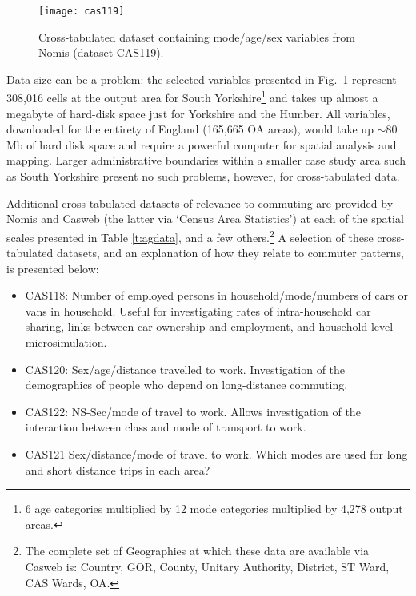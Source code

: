 \begin{figure}
\texttt{[image: cas119]}
\caption[Cross-tabulated dataset containing mode/age/sex
variables]{Cross-tabulated dataset containing mode/age/sex variables from Nomis
(dataset CAS119).}
\label{fig:cas119}
\end{figure}
Data size can be a problem: the selected variables presented in
Fig.~\ref{fig:cas119} represent 308,016 cells at the output area for
South Yorkshire\footnote{6 age categories multiplied by 12 mode
categories multiplied by 4,278 output areas.}
and takes up almost a megabyte of
hard-disk space just for Yorkshire and the Humber. All variables, downloaded for
the entirety of England (165,665 OA areas), would take up $\sim$80 Mb of hard
disk space and require a powerful computer for spatial analysis and mapping.
Larger administrative boundaries within a smaller case study area such as South
Yorkshire present no such problems, however, for cross-tabulated data.

Additional cross-tabulated datasets of relevance to commuting are provided by
Nomis and Casweb (the latter via `Census Area Statistics') at each of the
spatial scales presented in Table \ref{t:agdata}, and a few others.\footnote{The
complete set of Geographies at which these data are available via Casweb
is: Country, GOR, 	County, 	Unitary Authority, 	District,
ST Ward, CAS Wards, 	OA.
} A
selection of these cross-tabulated datasets, and an explanation of how they
relate to commuter patterns, is presented below:
\begin{itemize}
 \item  CAS118: Number of employed persons in household/mode/numbers of cars
or vans in household. Useful for investigating rates of intra-household car
sharing, links between car ownership and employment, and household level
microsimulation.
\item CAS120: Sex/age/distance travelled to work. Investigation of the
demographics of people who depend on long-distance commuting.
\item CAS122:	NS-Sec/mode of travel to work. Allows investigation of the
interaction between class and mode of transport to work.
\item CAS121	Sex/distance/mode of travel to work. Which modes are used for
long and short distance trips in each area?
\end{itemize}

